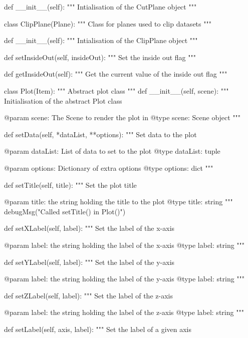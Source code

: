 \begin{python}
\begin{python}
\begin{verbose}
    def __init__(self):
        """
        Intialisation of the CutPlane object
        """


class ClipPlane(Plane):
    """
    Class for planes used to clip datasets
    """

    def __init__(self):
        """
        Intialisation of the ClipPlane object
        """

    def setInsideOut(self, insideOut):
        """
        Set the inside out flag
        """

    def getInsideOut(self):
        """
        Get the current value of the inside out flag
        """

class Plot(Item):
    """
    Abstract plot class
    """
    def __init__(self, scene):
        """
        Initialisation of the abstract Plot class
        
        @param scene: The Scene to render the plot in
        @type scene: Scene object
        """

    def setData(self, *dataList, **options):
        """
        Set data to the plot

        @param dataList: List of data to set to the plot
        @type dataList: tuple

	@param options: Dictionary of extra options
	@type options: dict
        """

    def setTitle(self, title):
        """
        Set the plot title

        @param title: the string holding the title to the plot
        @type title: string
        """
        debugMsg("Called setTitle() in Plot()")


    def setXLabel(self, label):
        """
        Set the label of the x-axis

        @param label: the string holding the label of the x-axis
        @type label: string
        """

    def setYLabel(self, label):
        """
        Set the label of the y-axis

        @param label: the string holding the label of the y-axis
        @type label: string
        """

    def setZLabel(self, label):
        """
        Set the label of the z-axis

        @param label: the string holding the label of the z-axis
        @type label: string
        """

    def setLabel(self, axis, label):
        """
        Set the label of a given axis


\end{verbose}
\end{python}
\end{python}

